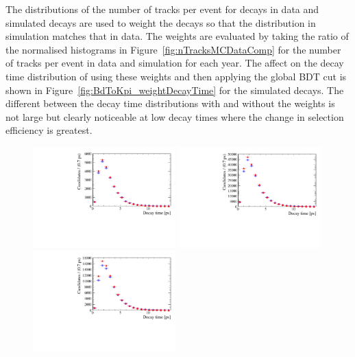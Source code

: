 The distributions of the number of tracks per event for \bdkpi decays in data and simulated decays are used to weight the \bdkpi decays so that the distribution in simulation matches that in data. The weights are evaluated by taking the ratio of the normalised histograms in Figure~\ref{fig:nTracksMCDataComp} for the number of tracks per event in data and simulation for each year. The affect on the decay time distribution of using these weights and then applying the global BDT cut is shown in Figure~\ref{fig:BdToKpi_weightDecayTime} for the simulated \bdkpi decays. The different between the decay time distributions with and without the weights is not large but clearly noticeable at low decay times where the change in selection efficiency is greatest. 

\begin{figure}[htbp]
  \centering
    \includegraphics[width=0.49\textwidth]{./Figs/LifetimeMeasurement/2011_decaytime_Bd2KPi_weighting_impact.pdf}
    \includegraphics[width=0.49\textwidth]{./Figs/LifetimeMeasurement/2012_decaytime_Bd2KPi_weighting_impact.pdf}
    \includegraphics[width=0.49\textwidth]{./Figs/LifetimeMeasurement/2015_decaytime_Bd2KPi_weighting_impact.pdf}

\end{figure}
